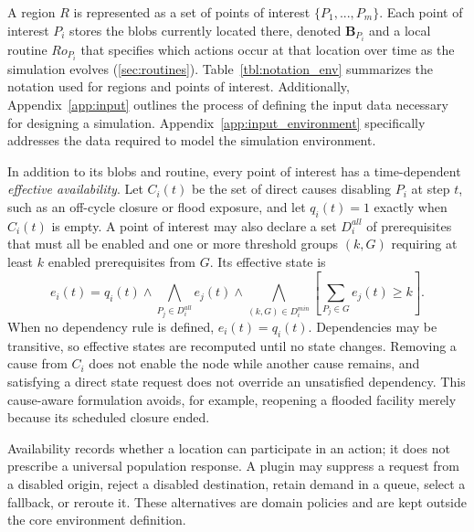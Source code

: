 \documentclass[pdflatex,sn-mathphys-num]{sn-jnl}%
\newcommand\redb[1]{#1}
\theoremstyle{thmstyleone}%
\theoremstyle{thmstyletwo}%
\theoremstyle{thmstylethree}%
\begin{document}
\redb{A region $R$ is represented as a set of points of interest $\{P_1, ..., P_m\}$. Each point of interest $P_i$ stores the blobs currently located there, denoted $\bm{B}_{P_i}$ and a local routine $Ro_{P_i}$
that specifies which actions occur at that location over time as the simulation evolves (\ref{sec:routines}). Table~\ref{tbl:notation_env} summarizes the notation used for regions and points of interest.} 
Additionally, Appendix~\ref{app:input} outlines the process of defining the input data necessary for designing a simulation. Appendix~\ref{app:input_environment} specifically addresses the data required to model the simulation environment.

\begingroup\color{red}
In addition to its blobs and routine, every point of interest has a time-dependent \textit{effective availability}. Let $C_i(t)$ be the set of direct causes disabling $P_i$ at step $t$, such as an off-cycle closure or flood exposure, and let $q_i(t)=1$ exactly when $C_i(t)$ is empty. A point of interest may also declare a set $D_i^{all}$ of prerequisites that must all be enabled and one or more threshold groups $(k,G)$ requiring at least $k$ enabled prerequisites from $G$. Its effective state is
\begin{equation}
e_i(t)=q_i(t)\land
\bigwedge_{P_j\in D_i^{all}} e_j(t)\land
\bigwedge_{(k,G)\in D_i^{min}}
\left[\sum_{P_j\in G} e_j(t)\geq k\right].
\label{eq:node_availability}
\end{equation}
When no dependency rule is defined, $e_i(t)=q_i(t)$. Dependencies may be transitive, so effective states are recomputed until no state changes. Removing a cause from $C_i$ does not enable the node while another cause remains, and satisfying a direct state request does not override an unsatisfied dependency. This cause-aware formulation avoids, for example, reopening a flooded facility merely because its scheduled closure ended.

Availability records whether a location can participate in an action; it does not prescribe a universal population response. A plugin may suppress a request from a disabled origin, reject a disabled destination, retain demand in a queue, select a fallback, or reroute it. These alternatives are domain policies and are kept outside the core environment definition.
\endgroup


\end{document}
